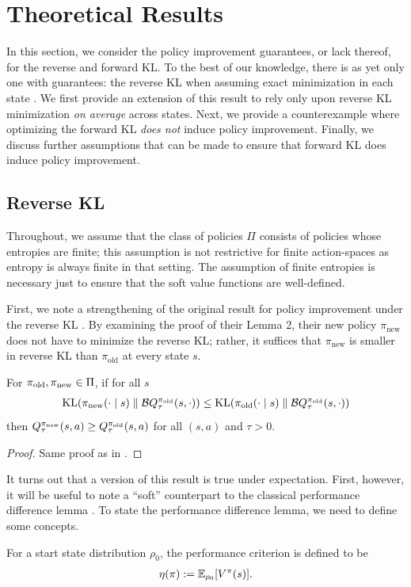 \documentclass[\main/thesis.tex]{subfiles}
\begin{document}
\chapter{Theoretical Results}


In this section, we consider the policy improvement guarantees, or lack thereof, for the reverse and forward KL. To the best of our knowledge, there is as yet only one with guarantees: the reverse KL when assuming exact minimization in each state \citep[Lemma 2]{haarnoja2018soft}. We first provide an extension of this result to rely only upon reverse KL minimization \textit{on average} across states. Next, we provide a counterexample where optimizing the forward KL \textit{does not} induce policy improvement.  Finally, we discuss further assumptions that can be made to ensure that forward KL does induce policy improvement.

\section{Reverse KL}
Throughout, we assume that the class of policies $\Pi$ consists of policies whose entropies are finite; this assumption is not restrictive for finite action-spaces as entropy is always finite in that setting. The assumption of finite entropies is necessary just to ensure that the soft value functions are well-defined. 

First, we note a strengthening of the original result for policy improvement under the reverse KL \citep{haarnoja2018soft}. By examining the proof of their Lemma 2, their new policy $\pi_{\mathrm{new}}$ does not have to minimize the reverse KL; rather, it suffices that $\pi_{\mathrm{new}}$ is smaller in reverse KL than $\pi_{\mathrm{old}}$ at every state $s$. 
\begin{lemma}\label{lem:stronger-sac}
For ${\pi_\mathrm{old}}, {\pi_\mathrm{new}} \in \Pi$, if for all $s$
\begin{align*}
    \mathrm{KL}({\pi_\mathrm{new}}(\cdot \mid s) \parallel \mathcal{B}Q^{\pi_\mathrm{old}}_\tau(s, \cdot)) \le \mathrm{KL}({\pi_\mathrm{old}}(\cdot \mid s) \parallel \mathcal{B}Q_\tau^{\pi_\mathrm{old}}(s, \cdot))\nonumber
\end{align*}
then $Q^{\pi_\mathrm{new}}_\tau(s, a) \geq Q^{\pi_\mathrm{old}}_\tau(s, a)$ for all $(s, a)$ and $\tau > 0$.
\end{lemma}
\begin{proof}
Same proof as in \citet{haarnoja2018soft}.
\end{proof}
It turns out that a version of this result is true under expectation. First, however, it will be useful to note a ``soft'' counterpart to the classical performance difference lemma \citep{kakade2002approximately}. To state the performance difference lemma, we need to define some concepts. 
\begin{definition}\label{def:perf-criterion}
For a start state distribution $\rho_0$, the performance criterion is defined to be
\begin{align*}
    \eta(\pi) := \mathbb{E}_{\rho_0}[V^\pi(s)].
\end{align*}
\end{definition}
\end{document}
